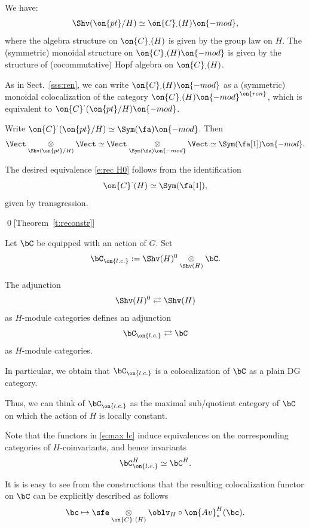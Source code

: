 \documentclass[9pt]{amsart}
\theoremstyle{definition}
\theoremstyle{remark}
\newcommand{\thmref}[1]{Theorem~\ref{#1}}
\newcommand{\secref}[1]{Sect.~\ref{#1}}
\numberwithin{equation}{section}
\renewcommand{\mod}{{\on{-mod}}}
\begin{document}
\sssec{}

We have:
$$\Shv(\on{pt}/H)\simeq \on{C}_\cdot(H)\mod,$$
where the algebra structure on $\on{C}_\cdot(H)$ is given by the group law on $H$. The (symmetric) monoidal structure 
on $\on{C}_\cdot(H)\mod$ is given by the structure of (cocommutative) Hopf algebra on $\on{C}_\cdot(H)$.

\medskip

As in \secref{sss:ren}, we can write $\on{C}_\cdot(H)\mod$ as a (symmetric) monoidal colocalization of
the category $\on{C}_\cdot(H)\mod^{\on{ren}}$, which is equivalent to
$\on{C}^\cdot(\on{pt}/H)\mod$. 

\medskip

Write $\on{C}^\cdot(\on{pt}/H)\simeq \Sym(\fa)\mod$. Then 
$$\Vect \underset{\Shv(\on{pt}/H)}\otimes \Vect\simeq \Vect\underset{ \Sym(\fa)\mod}\otimes \Vect\simeq \Sym(\fa[1])\mod.$$

The desired equivalence \eqref{e:rec H0} follows from the identification
$$\on{C}^\cdot(H)\simeq \Sym(\fa[1]),$$
given by transgression. 

\qed[\thmref{t:reconstr}]

  \label{ss:max}

\sssec{}

Let $\bC$ be equipped with an action of $G$. Set
$$\bC_{\on{l.c.}}:=\Shv(H)^0\underset{\Shv(H)}\otimes \bC.$$

The adjunction
$$\Shv(H)^0\rightleftarrows \Shv(H)$$
as $H$-module categories defines an adjunction
\begin{equation} \label{e:max lc}
\bC_{\on{l.c.}}\rightleftarrows \bC
\end{equation} 
as $H$-module categories.

\medskip

In particular, we obtain that $\bC_{\on{l.c.}}$ is a colocalization of $\bC$
as a plain DG category. 

\medskip

Thus, we can think of  $\bC_{\on{l.c.}}$ as the maximal sub/quotient category of $\bC$
on which the action of $H$ is locally constant.

\sssec{}

Note that the functors in \eqref{e:max lc} induce equivalences on the corresponding categories
of $H$-coinvariants, and hence invariants
$$\bC_{\on{l.c.}}^H\simeq \bC^H.$$

It is is easy to see from the constructions that the resulting colocalization functor on $\bC$ can be explicitly described 
as follows 
\begin{equation} \label{e:coloc expl}
\bc\mapsto \sfe\underset{\on{C}^\cdot(H)}\otimes\oblv_H\circ \on{Av}^H_*(\bc).
\end{equation} 
\end{document}
